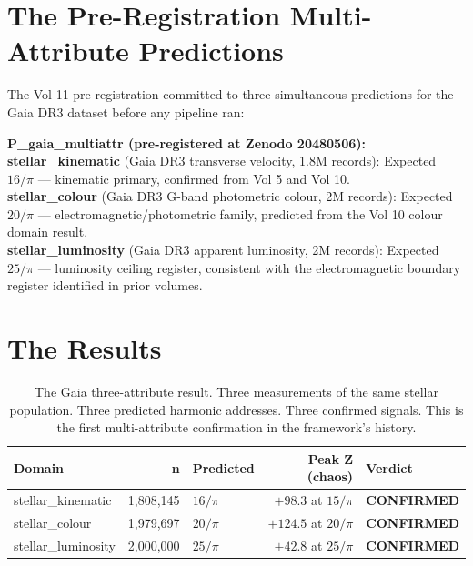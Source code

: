 \documentclass[11pt, letterpaper, openany]{book}
\begin{document}
\begin{empiricalbox}
\section{The Pre-Registration Multi-Attribute Predictions}

The Vol 11 pre-registration committed to three simultaneous predictions
for the Gaia DR3 dataset before any pipeline ran:

\begin{predictionbox}
\textbf{P\_gaia\_multiattr (pre-registered at Zenodo 20480506):}\\[0.5em]
\textbf{stellar\_kinematic} (Gaia DR3 transverse velocity, 1.8M records):
Expected $16/\pi$ --- kinematic primary, confirmed from Vol 5 and Vol 10.\\[0.5em]
\textbf{stellar\_colour} (Gaia DR3 G-band photometric colour, 2M records):
Expected $20/\pi$ --- electromagnetic/photometric family, predicted from
the Vol 10 colour domain result.\\[0.5em]
\textbf{stellar\_luminosity} (Gaia DR3 apparent luminosity, 2M records):
Expected $25/\pi$ --- luminosity ceiling register, consistent with the
electromagnetic boundary register identified in prior volumes.
\end{predictionbox}

\section{The Results}

\begin{table}[H]
\centering
\renewcommand{\arraystretch}{1.5}
\small
\begin{tabular}{|l|r|l|r|l|}
\hline
\rowcolor{kishblue!10}
\textbf{Domain} & \textbf{n} & \textbf{Predicted} & \textbf{Peak Z (chaos)} & \textbf{Verdict} \\
\hline\hline
\rowcolor{colourgold!10}
stellar\_kinematic  & 1,808,145 & $16/\pi$ & $+98.3$ at $15/\pi$ & \textbf{CONFIRMED} \\
\rowcolor{colourgold!8}
stellar\_colour     & 1,979,697 & $20/\pi$ & $+124.5$ at $20/\pi$ & \textbf{CONFIRMED} \\
\rowcolor{colourgold!6}
stellar\_luminosity & 2,000,000 & $25/\pi$ & $+42.8$ at $25/\pi$  & \textbf{CONFIRMED} \\
\hline
\end{tabular}
\caption{The Gaia three-attribute result. Three measurements of the same stellar
population. Three predicted harmonic addresses. Three confirmed signals. This is
the first multi-attribute confirmation in the framework's history.}
\label{tab:gaia_multiattr}
\end{table}


\end{empiricalbox}
\end{document}
